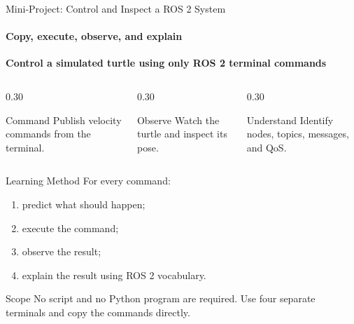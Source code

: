 \begin{frame}{Mini-Project: Control and Inspect a ROS 2 System}
\framesubtitle{Copy, execute, observe, and explain}

\footnotesize

\begin{center}
    \Large
    \textbf{Control a simulated turtle using only ROS 2 terminal commands}
\end{center}

\vspace{0.20cm}

\begin{columns}[T,onlytextwidth]
    \begin{column}{0.30\textwidth}
        \begin{block}{Command}
            Publish velocity commands from the terminal.
        \end{block}
    \end{column}
    \hfill
    \begin{column}{0.30\textwidth}
        \begin{block}{Observe}
            Watch the turtle and inspect its pose.
        \end{block}
    \end{column}
    \hfill
    \begin{column}{0.30\textwidth}
        \begin{block}{Understand}
            Identify nodes, topics, messages, and QoS.
        \end{block}
    \end{column}
\end{columns}

\pause

\begin{exampleblock}{Learning Method}
For every command:

\begin{enumerate}
    \setlength{\itemsep}{0.12em}
    \item predict what should happen;
    \item execute the command;
    \item observe the result;
    \item explain the result using ROS 2 vocabulary.
\end{enumerate}
\end{exampleblock}

\begin{alertblock}{Scope}
No script and no Python program are required.
Use four separate terminals and copy the commands directly.
\end{alertblock}

\end{frame}

